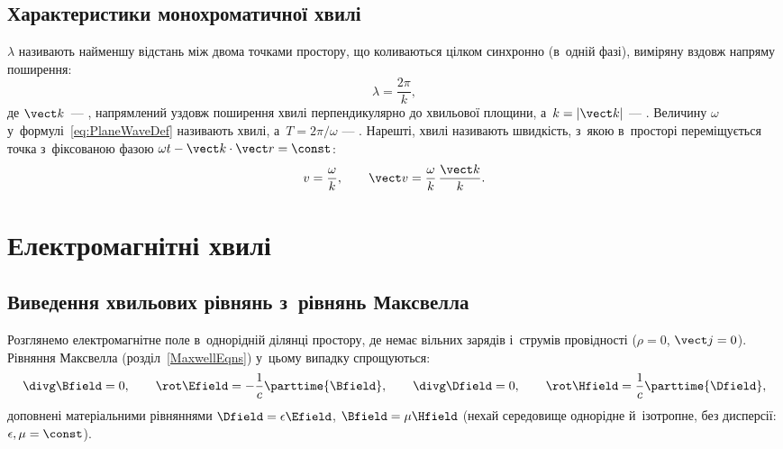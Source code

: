 \subsection*{Характеристики монохроматичної хвилі}

 $\lambda$ називають найменшу відстань між двома точками простору, що коливаються цілком синхронно (в~одній
фазі), виміряну вздовж напряму поширення:
\begin{equation}\label{eq:Wavelength}
	\lambda = \frac{2\pi}{k},
\end{equation}
де $\vect k$~--- , напрямлений уздовж поширення хвилі перпендикулярно до хвильової площини, а~$k=|\vect k|$ ---
. Величину $\omega$ у~формулі~\eqref{eq:PlaneWaveDef} називають  хвилі, а~$T=2\pi/\omega$ ---
. Нарешті,  хвилі називають швидкість, з~якою в~просторі переміщується точка з~фіксованою фазою
$\omega t - \vect k\cdot\vect r = \const$:
\begin{equation}\label{eq:PhaseVelocity}
	v = \frac\omega k, \qquad \vect v = \frac\omega k\,\frac{\vect k}k.
\end{equation}

\section{Електромагнітні хвилі}\hypertarget{electromagnetic-waves}{}

\subsection*{Виведення хвильових рівнянь з~рівнянь Максвелла}

Розглянемо електромагнітне поле в~однорідній ділянці простору, де немає вільних зарядів і~струмів провідності ($\rho=0$, $\vect j=0$). Рівняння
Максвелла (розділ~\ref{MaxwellEqns}) у~цьому випадку спрощуються:
\begin{equation}\label{eq:MaxwellNoSources}
	\divg\Bfield=0, \qquad \rot\Efield = -\frac1c\parttime{\Bfield}, \qquad \divg\Dfield=0, \qquad \rot\Hfield = \frac1c\parttime{\Dfield},
\end{equation}
доповнені матеріальними рівняннями $\Dfield=\epsilon\Efield$, $\Bfield=\mu\Hfield$ (нехай середовище однорідне й~ізотропне, без дисперсії: $\epsilon,\mu=\const$).

